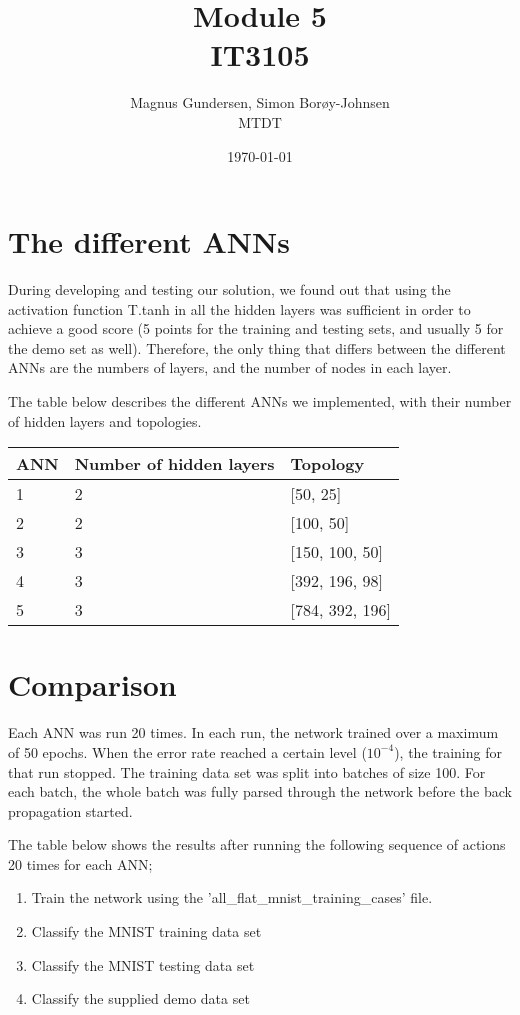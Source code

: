 \documentclass{article}
\begin{document}
\title{\textbf{Module 5} \\ IT3105}
\author{Magnus Gundersen, Simon Borøy-Johnsen \\ MTDT}
\date{\today}
\maketitle


\section{The different ANNs}
During developing and testing our solution, we found out that using the activation function T.tanh in all the hidden layers was sufficient in order to achieve a good score (5 points for the training and testing sets, and usually 5 for the demo set as well). Therefore, the only thing that differs between the different ANNs are the numbers of layers, and the number of nodes in each layer.

The table below describes the different ANNs we implemented, with their number of hidden layers and topologies.

\begin{tabular}{|l|l|l|}
    \hline
    ANN & Number of hidden layers & Topology        \\\hline
    1   & 2                       & [50, 25]        \\\hline
    2   & 2                       & [100, 50]       \\\hline
    3   & 3                       & [150, 100, 50]  \\\hline
    4   & 3                       & [392, 196, 98]  \\\hline
    5   & 3                       & [784, 392, 196] \\\hline
\end{tabular}

\section{Comparison}
Each ANN was run 20 times. In each run, the network trained over a maximum of 50 epochs. When the error rate reached a certain level ($10^{-4}$), the training for that run stopped. The training data set was split into batches of size 100. For each batch, the whole batch was fully parsed through the network before the back propagation started.

The table below shows the results after running the following sequence of actions 20 times for each ANN;
\begin{enumerate}
    \item Train the network using the 'all\_flat\_mnist\_training\_cases' file.
    \item Classify the MNIST training data set
    \item Classify the MNIST testing data set
    \item Classify the supplied demo data set
\end{enumerate}
\end{document}
